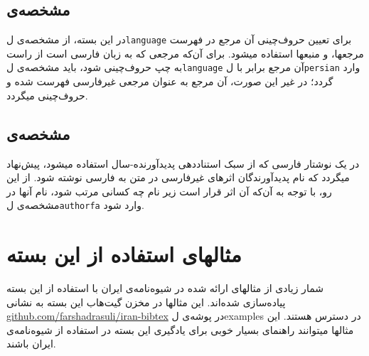 \documentclass[a4paper,11pt]{article}
\begin{document}
\subsection{مشخصه‌ی }
در این بسته، از مشخصه‌ی \م‌ل{\tt language} برای تعیین حروف‌چینی آن مرجع در فهرست مرجعها، و منبعها استفاده میشود. برای آن‌که مرجعی که به زبان فارسی است از راست به چپ حروف‌چینی شود، باید مشخصه‌ی \م‌ل{\tt language} آن مرجع برابر با \م‌ل{\tt persian} وارد گردد؛ در غیر این صورت، آن مرجع به عنوان مرجعی غیرفارسی فهرست شده و حروف‌چینی میگردد.


\subsection{مشخصه‌ی }
در یک نوشتار فارسی که از سبک استناددهی پدیدآورنده-سال استفاده میشود، پیش‌نهاد میگردد که نام پدیدآورندگان اثرهای غیرفارسی در متن به فارسی نوشته شود. از این رو، با توجه به آن‌که آن اثر قرار است زیر نام چه کسانی مرتب شود، نام آنها در مشخصه‌ی \م‌ل{\tt authorfa} وارد شود.



\section{مثالهای استفاده از این بسته}
شمار زیادی از مثالهای ارائه شده در شیوه‌نامه‌ی ایران با استفاده از این بسته پیاده‌سازی شده‌اند. این مثالها در مخزن گیت‌هاب این بسته به نشانی
\href{https://github.com/farshadrasuli/iran-bibtex}{github.com/farshadrasuli/iran-bibtex}
در پوشه‌ی \م‌ل{examples} در دسترس هستند. این مثالها میتوانند راهنمای بسیار خوبی برای یادگیری این بسته در استفاده از شیوه‌نامه‌ی ایران باشند.
\end{document}
